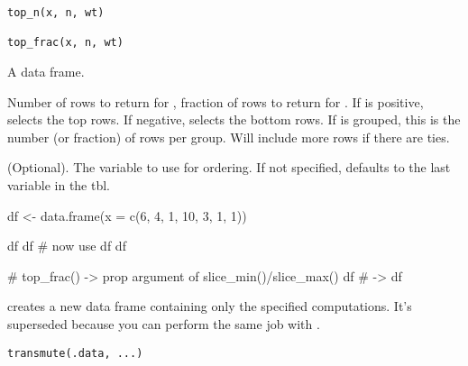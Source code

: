 \documentclass[a4paper]{book}
\begin{document}
%
\begin{Usage}
\begin{verbatim}
top_n(x, n, wt)

top_frac(x, n, wt)
\end{verbatim}
\end{Usage}
%
\begin{Arguments}
\begin{ldescription}
\item[\code{x}] A data frame.

\item[\code{n}] Number of rows to return for , fraction of rows to
return for . If  is positive, selects the top rows.
If negative, selects the bottom rows.
If  is grouped, this is the number (or fraction) of rows per group.
Will include more rows if there are ties.

\item[\code{wt}] (Optional). The variable to use for ordering. If not
specified, defaults to the last variable in the tbl.
\end{ldescription}
\end{Arguments}
%
\begin{Examples}
\begin{ExampleCode}
df <- data.frame(x = c(6, 4, 1, 10, 3, 1, 1))

df %
df %
# now use
df %
df %

# top_frac() -> prop argument of slice_min()/slice_max()
df %
# ->
df %
\end{ExampleCode}
\end{Examples}
%
\begin{Description}
\strong{[Superseded]}

 creates a new data frame containing only the specified
computations. It's superseded because you can perform the same job
with .
\end{Description}
%
\begin{Usage}
\begin{verbatim}
transmute(.data, ...)
\end{verbatim}
\end{Usage}
%
\end{document}
